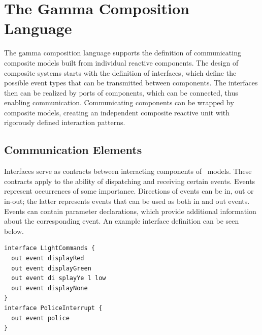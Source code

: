 %
%

\section{The Gamma Composition Language}
\label{sec:composition-language}
The gamma composition language supports the definition of communicating composite models
built from individual reactive components. The design of composite systems starts with the definition of interfaces, which define the possible event types that can be transmitted between components. The interfaces then can be realized by ports of components, which can be connected, thus enabling communication. Communicating components can be wrapped by composite models, creating an independent composite reactive unit with rigorously defined interaction patterns.

\subsection{Communication Elements}
Interfaces serve as contracts between
interacting components of \gamma\ models. These contracts apply to the ability of dispatching
and receiving certain events. Events represent occurrences of some importance. Directions of events can be in, out or in-out;
the latter represents events that can be used as both in and out events. Events can contain
parameter declarations, which provide additional information about the corresponding event. An example interface definition can be seen below.
\begin{lstlisting}
interface LightCommands {
  out event displayRed
  out event displayGreen
  out event di splayYe l low
  out event displayNone
}
interface PoliceInterrupt {
  out event police
}
\end{lstlisting}

